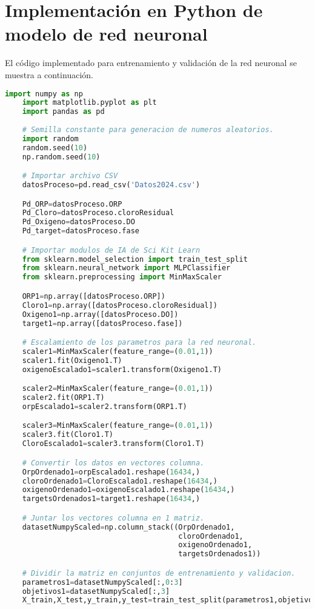 \chapter{Implementación en Python de modelo de red neuronal}

El código implementado para entrenamiento y validación de la red neuronal se muestra a continuación.

\begin{lstlisting}[language=Python]
	import numpy as np
	import matplotlib.pyplot as plt
	import pandas as pd
	
	# Semilla constante para generacion de numeros aleatorios. 
	import random
	random.seed(10)
	np.random.seed(10)

	# Importar archivo CSV
	datosProceso=pd.read_csv('Datos2024.csv')

	Pd_ORP=datosProceso.ORP
	Pd_Cloro=datosProceso.cloroResidual
	Pd_Oxigeno=datosProceso.DO
	Pd_target=datosProceso.fase

	# Importar modulos de IA de Sci Kit Learn
	from sklearn.model_selection import train_test_split
	from sklearn.neural_network import MLPClassifier
	from sklearn.preprocessing import MinMaxScaler

	ORP1=np.array([datosProceso.ORP])
	Cloro1=np.array([datosProceso.cloroResidual])
	Oxigeno1=np.array([datosProceso.DO])
	target1=np.array([datosProceso.fase])

	# Escalamiento de los parametros para la red neuronal.
	scaler1=MinMaxScaler(feature_range=(0.01,1))
	scaler1.fit(Oxigeno1.T)
	oxigenoEscalado1=scaler1.transform(Oxigeno1.T)

	scaler2=MinMaxScaler(feature_range=(0.01,1))
	scaler2.fit(ORP1.T)
	orpEscalado1=scaler2.transform(ORP1.T)

	scaler3=MinMaxScaler(feature_range=(0.01,1))
	scaler3.fit(Cloro1.T)
	CloroEscalado1=scaler3.transform(Cloro1.T)

	# Convertir los datos en vectores columna.
	OrpOrdenado1=orpEscalado1.reshape(16434,)
	cloroOrdenado1=CloroEscalado1.reshape(16434,)
	oxigenoOrdenado1=oxigenoEscalado1.reshape(16434,)
	targetsOrdenados1=target1.reshape(16434,)

	# Juntar los vectores columna en 1 matriz.
	datasetNumpyScaled=np.column_stack((OrpOrdenado1,
                                        cloroOrdenado1,
                                        oxigenoOrdenado1,
                                        targetsOrdenados1))

	# Dividir la matriz en conjuntos de entrenamiento y validacion.
	parametros1=datasetNumpyScaled[:,0:3]
	objetivos1=datasetNumpyScaled[:,3]
	X_train,X_test,y_train,y_test=train_test_split(parametros1,objetivos1,train_size=0.8,random_state=10,shuffle=True)


\end{lstlisting}
